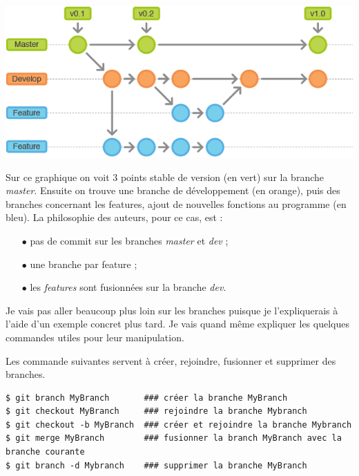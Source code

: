 \documentclass[12pt,a4paper]{article}
\begin{document}
\centerline{
\includegraphics[width=0.7\linewidth]{git-branch}}

Sur ce graphique on voit 3 points stable de version (en vert) sur la branche \emph{master}. Ensuite on trouve une branche de développement (en orange), puis des branches concernant les features, ajout de nouvelles fonctions au programme (en bleu). La philosophie des auteurs, pour ce cas, est :
\begin{itemize}
\item[$\bullet$] pas de commit sur les branches \emph{master} et \emph{dev} ;
\item[$\bullet$] une branche par feature ;
\item[$\bullet$] les \emph{features} sont fusionnées sur la branche \emph{dev}.
\end{itemize}

Je vais pas aller beaucoup plus loin sur les branches puisque je l'expliquerais à l'aide d'un exemple concret plus tard. Je vais quand même expliquer les quelques commandes utiles pour leur manipulation.

Les commande suivantes servent à créer, rejoindre, fusionner et supprimer des branches.

\begin{verbatim}
$ git branch MyBranch		### créer la branche MyBranch
$ git checkout MyBranch		### rejoindre la branche Mybranch
$ git checkout -b MyBranch	### créer et rejoindre la branche Mybranch
$ git merge MyBranch		### fusionner la branch MyBranch avec la
branche courante
$ git branch -d Mybranch	### supprimer la branche MyBranch
\end{verbatim}



\end{document}
